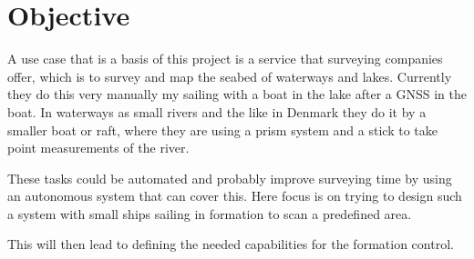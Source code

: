 \section{Objective}


A use case that is a basis of this project is a service that surveying
companies offer, which is to survey and map the seabed of waterways and
lakes. Currently they do this very manually my sailing with a boat in
the lake after a \ac{GNSS} in the boat. In waterways as small rivers
and the like in Denmark they do it by a smaller boat or raft, where
they are using a prism system and a stick to take point measurements
of the river.

These tasks could be automated and probably improve surveying time by
using an autonomous system that can cover this. Here focus is on
trying to design such a system with small ships sailing in formation
to scan a predefined area.

This will then lead to defining the needed capabilities for
the formation control.


